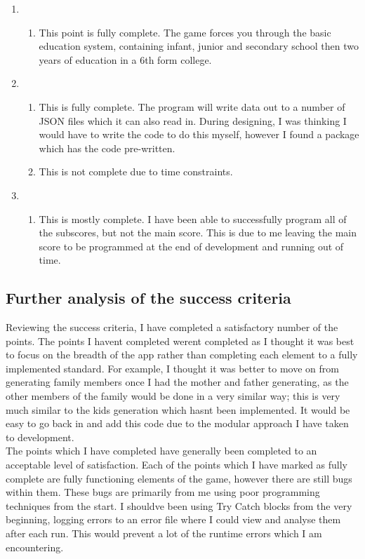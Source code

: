 \begin{enumerate}
\begin{enumerate}
        \end{enumerate}
        \item \begin{enumerate}
            \item This point is fully complete. The game forces you through the basic education system, containing infant, junior and secondary school then two years of education in a 6th form college.
        \end{enumerate}
        \item \begin{enumerate}
            \item This is fully complete. The program will write data out to a number of JSON files which it can also read in. During designing, I was thinking I would have to write the code to do this myself, however I found a package which has the code pre-written.
            \item This is not complete due to time constraints.
        \end{enumerate}
        \item \begin{enumerate}
            \item This is mostly complete. I have been able to successfully program all of the subscores, but not the main score. This is due to me leaving the main score to be programmed at the end of development and running out of time. 
        \end{enumerate}
\end{enumerate}
\subsection{Further analysis of the success criteria}
Reviewing the success criteria, I have completed a satisfactory number of the points. The points I haven\textquotesingle t completed weren\textquotesingle t completed as I thought it was best to focus on the breadth of the app rather than completing each element to a fully implemented standard. For example, I thought it was better to move on from generating family members once I had the mother and father generating, as the other members of the family would be done in a very similar way; this is very much similar to the kids generation which hasn\textquotesingle t been implemented. It would be easy to go back in and add this code due to the modular approach I have taken to development.\\
The points which I have completed have generally been completed to an acceptable level of satisfaction. Each of the points which I have marked as fully complete are fully functioning elements of the game, however there are still bugs within them. These bugs are primarily from me using poor programming techniques from the start. I should\textquotesingle ve been using Try Catch blocks from the very beginning, logging errors to an error file where I could view and analyse them after each run. This would prevent a lot of the runtime errors which I am encountering.

